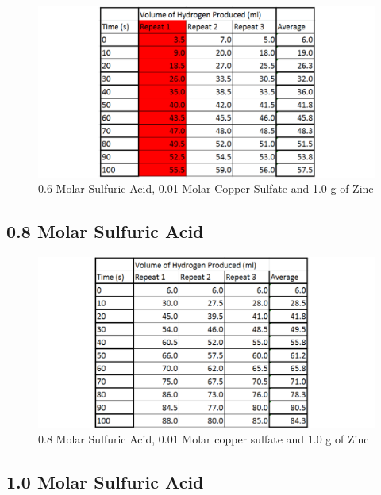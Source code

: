 \begin{figure}[H]
    \includegraphics[width=\textwidth]{./Experiment/Images/2FixedCatalyst/06Molar.pdf}
    \caption{0.6 Molar Sulfuric Acid, 0.01 Molar Copper Sulfate and 1.0 g of Zinc} \label{fig:06SACSRawData}
\end{figure}

	\subsection{0.8 Molar Sulfuric Acid}

\begin{figure}[H]
    \includegraphics[width=\textwidth]{./Experiment/Images/2FixedCatalyst/08Molar.pdf}
    \caption{0.8 Molar Sulfuric Acid, 0.01 Molar copper sulfate and 1.0 g of Zinc} \label{fig:08SACSRawData}
\end{figure}

	\subsection{1.0 Molar Sulfuric Acid}

